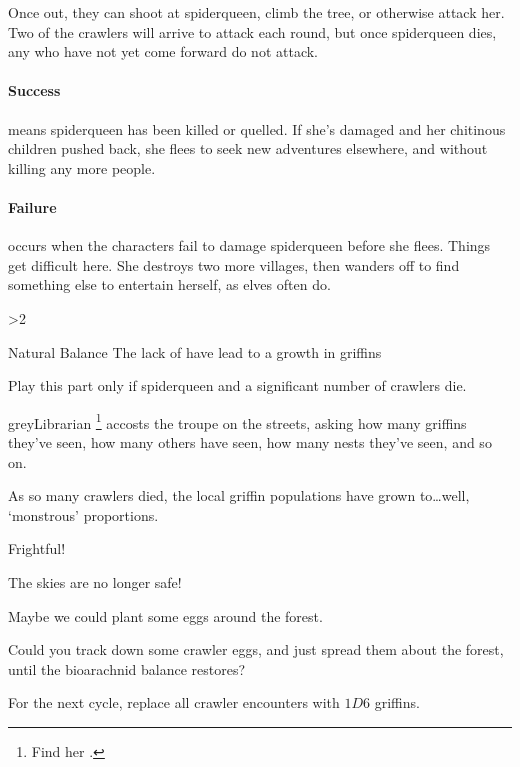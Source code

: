 Once out, they can shoot at \gls{spiderqueen}, climb the tree, or otherwise attack her.
Two of the \glspl{crawler} will arrive to attack each round, but once \gls{spiderqueen} dies, any who have not yet come forward do not attack.

\paragraph{Success} means \gls{spiderqueen} has been killed or quelled.
If she's damaged and her chitinous children pushed back, she flees to seek new adventures elsewhere, and without killing any more people.

\paragraph{Failure} occurs when the characters fail to damage \gls{spiderqueen} before she flees.
Things get difficult here.
She destroys two more \glspl{village}, then wanders off to find something else to entertain herself, as elves often do.

\spiderqueen

\showStdSpells[
  
  
  \setcounter{enc}{3}
]

\ifnum\value{cycle}>2
  
\fi


{Natural Balance}%
{The lack of  have lead to a growth in griffins}%

Play this part only if \gls{spiderqueen} and a significant number of \glspl{crawler} die.

\Gls{greyLibrarian}%
\footnote{Find her .}
accosts the troupe on the streets, asking how many \glspl{griffin} they've seen, how many others have seen, how many nests they've seen, and so on.

\begin{speechtext}
  As so many \glspl{crawler} died, the local griffin populations have grown to\ldots well, `monstrous' proportions.

  Frightful!

  The skies are no longer safe!

  Maybe we could plant some eggs around the forest.

  Could you track down some \gls{crawler} eggs, and just spread them about the forest, until the bioarachnid balance restores?
\end{speechtext}

For the next \gls{cycle}, replace all \gls{crawler} encounters with $1D6$ griffins.

